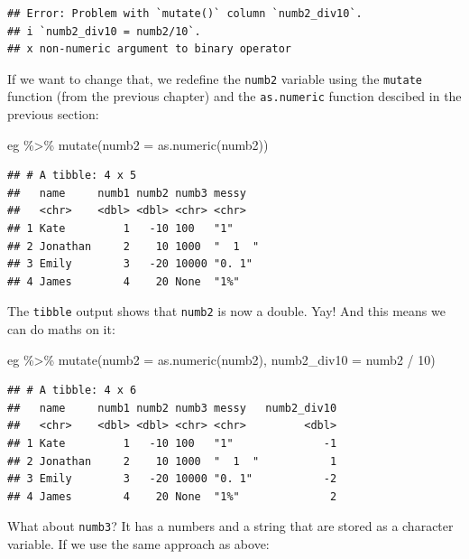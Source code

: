 \documentclass[
]{book}
\newenvironment{Shaded}{\begin{snugshade}}{\end{snugshade}}
\newcommand{\AttributeTok}[1]{\textcolor[rgb]{0.77,0.63,0.00}{#1}}
\newcommand{\DecValTok}[1]{\textcolor[rgb]{0.00,0.00,0.81}{#1}}
\newcommand{\FunctionTok}[1]{\textcolor[rgb]{0.00,0.00,0.00}{#1}}
\newcommand{\NormalTok}[1]{#1}
\newcommand{\SpecialCharTok}[1]{\textcolor[rgb]{0.00,0.00,0.00}{#1}}
\begin{document}
\begin{verbatim}
## Error: Problem with `mutate()` column `numb2_div10`.
## i `numb2_div10 = numb2/10`.
## x non-numeric argument to binary operator
\end{verbatim}

If we want to change that, we redefine the \texttt{numb2} variable using the \texttt{mutate} function (from the previous chapter) and the \texttt{as.numeric} function descibed in the previous section:

\begin{Shaded}
\begin{Highlighting}[]
\NormalTok{eg }\SpecialCharTok{\%\textgreater{}\%} 
  \FunctionTok{mutate}\NormalTok{(}\AttributeTok{numb2 =} \FunctionTok{as.numeric}\NormalTok{(numb2))}
\end{Highlighting}
\end{Shaded}

\begin{verbatim}
## # A tibble: 4 x 5
##   name     numb1 numb2 numb3 messy  
##   <chr>    <dbl> <dbl> <chr> <chr>  
## 1 Kate         1   -10 100   "1"    
## 2 Jonathan     2    10 1000  "  1  "
## 3 Emily        3   -20 10000 "0. 1" 
## 4 James        4    20 None  "1%"
\end{verbatim}

The \texttt{tibble} output shows that \texttt{numb2} is now a double. Yay! And this means we can do maths on it:

\begin{Shaded}
\begin{Highlighting}[]
\NormalTok{eg }\SpecialCharTok{\%\textgreater{}\%} 
  \FunctionTok{mutate}\NormalTok{(}\AttributeTok{numb2 =} \FunctionTok{as.numeric}\NormalTok{(numb2),}
         \AttributeTok{numb2\_div10 =}\NormalTok{ numb2 }\SpecialCharTok{/} \DecValTok{10}\NormalTok{)}
\end{Highlighting}
\end{Shaded}

\begin{verbatim}
## # A tibble: 4 x 6
##   name     numb1 numb2 numb3 messy   numb2_div10
##   <chr>    <dbl> <dbl> <chr> <chr>         <dbl>
## 1 Kate         1   -10 100   "1"              -1
## 2 Jonathan     2    10 1000  "  1  "           1
## 3 Emily        3   -20 10000 "0. 1"           -2
## 4 James        4    20 None  "1%"              2
\end{verbatim}

What about \texttt{numb3}? It has a numbers and a string that are stored as a character variable. If we use the same approach as above:
\end{document}
